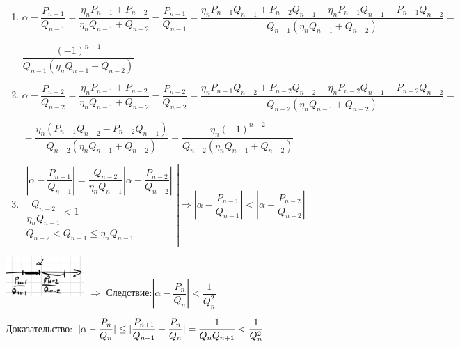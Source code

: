 \documentclass[12pt]{article}
\begin{document}
\begin{enumerate}
    \item
          $\alpha - \dfrac{P_{n-1}}{Q_{n-1}} = \dfrac{\eta_n P_{n-1} + P_{n-2}}{\eta_n Q_{n-1} + Q_{n-2}} - \dfrac{P_{n-1}}{Q_{n-1}}
              = \dfrac{\eta_n P_{n-1} Q_{n-1} + P_{n-2} Q_{n-1} - \eta_n P_{n-1} Q_{n-1} - P_{n-1} Q_{n-2}}{ Q_{n-1}(\eta_n Q_{n-1} + Q_{n-2})} =$

          $\dfrac{(-1)^{n-1}}{Q_{n-1}(\eta_n Q_{n-1} + Q_{n-2})}$

    \item $\alpha - \dfrac{P_{n-2}}{Q_{n-2}} = \dfrac{\eta_n P_{n-1} + P_{n-2}}{\eta_n Q_{n-1} + Q_{n-2}} - \dfrac{P_{n-2}}{Q_{n-2}}
              = \dfrac{\eta_n P_{n-1} Q_{n-2} + P_{n-2} Q_{n-2} - \eta_n P_{n-2} Q_{n-1} - P_{n-2} Q_{n-2}}{ Q_{n-2}(\eta_n Q_{n-1} + Q_{n-2})} = $

          $ = \dfrac{\eta_n (P_{n-1} Q_{n-2} - P_{n-2} Q_{n-1})}{Q_{n-2}(\eta_n Q_{n-1} + Q_{n-2}) }
              = \dfrac{\eta_n (-1)^{n-2}}{Q_{n-2}(\eta_n Q_{n-1} + Q_{n-2})}$

    \item $\left.\begin{array}{l}
                  \left|\alpha - \dfrac{P_{n-1}}{Q_{n-1}}\right| = \dfrac{Q_{n-2}}{\eta_n Q_{n-1}} \left|\alpha - \dfrac{P_{n-2}}{Q_{n-2}}\right| \\
                  \dfrac{Q_{n-2}}{\eta_n Q_{n-1}} < 1                                                                                             \\
                  Q_{n-2} < Q_{n-1} \leq \eta_n Q_{n-1}                                                                                           \\
              \end{array}\right|\Rightarrow \left|\alpha - \dfrac{P_{n-1}}{Q_{n-1}}\right| < \left|\alpha - \dfrac{P_{n-2}}{Q_{n-2}}\right|$
\end{enumerate}

\includegraphics[width=30mm]{image1.png}
$\Rightarrow$ Следствие:$ |\alpha - \dfrac{P_{n}}{Q_{n}}| < \dfrac{1}{Q^2_n}$

Доказательство: $|\alpha - \dfrac{P_{n}}{Q_{n}}| \leq |\dfrac{P_{n+1}}{Q_{n+1}} - \dfrac{P_{n}}{Q_{n}}| = \dfrac{1}{Q_n Q_{n+1}} < \dfrac{1}{Q^2_n}  \vspace{2 ex}$
\end{document}
